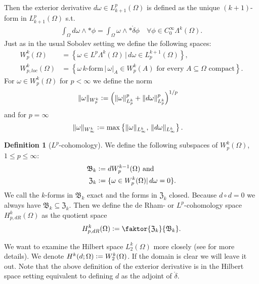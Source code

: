 \documentclass[12pt,a4paper]{article}
\theoremstyle{definition}
\newtheorem{definition}{Definition}
\newcommand{\lpcoho}{H^k_{p,dR}}
\newcommand{\norm}[1]{\lVert #1 \rVert}
\begin{document}
Then the exterior derivative $ d\omega \in L^p_{k+1}(\Omega)$ is defined as
the unique $(k+1)$-form in $L^p_{k+1}(\Omega)$ s.t. 
\begin{align*}
\int_\Omega d\omega \wedge *\phi = \int_\Omega \omega \wedge 
*\mathring{\delta}\phi
\quad \forall \phi \in C_0^\infty \Lambda^{k}(\Omega).
\end{align*}
Just as in the usual Sobolev setting we define the following spaces:
\begin{align*}
W^k_p(\Omega) &= \left\{ \omega \in L^p\Lambda^k(\Omega)\, | 
\, d\omega \in L_p^{k+1}(\Omega) \right\}, \\ %
W^k_{p,loc}(\Omega) &= \left\{ \omega \, k \text{-form} \, | \,
\omega|_A \in W^k_p(A) \text{ for every } A \subseteq \Omega 
\text{ compact} 
\right\}.
\end{align*}
For $\omega \in W^k_p(\Omega)$ for $p<\infty$ we define the norm 
\begin{align*}
\lVert \omega \rVert _{W^k_p} &\vcentcolon= 
\left( \norm{\omega}^p_{L^k_p} + \norm{d\omega}^p_{L^k_p} \right)^{1/p}
\end{align*}
and for $p=\infty$
\begin{align*}
    \lVert \omega \rVert _{W^k_\infty} &\vcentcolon= 
    \max\left\{ \norm{\omega}_{L^k_\infty},\, \norm{d\omega}_{L^k_\infty}
    \right\}.
\end{align*}
    
\begin{definition}[$L^p$-cohomology]
    We define the following subspaces of $W^k_p(\Omega)$, $1\leq p \leq\infty$:
    \begin{align*}
        \mathfrak{B}_k &\vcentcolon= dW^{k-1}_p(\Omega) \text{ and} \\
        \mathfrak{Z}_k &\vcentcolon= \{ \omega \in W^k_p(\Omega)| 
        \, d\omega = 0\}.
    \end{align*}
    We call the $k$-forms in $\mathfrak{B}_k$ exact and the forms in 
    $\mathfrak{Z}_k$ closed. Because $d \circ d=0$ we always have  
    $\mathfrak{B}_k \subseteq \mathfrak{Z}_k$.
    Then we define the de Rham- or $L^p$-cohomology space $\lpcoho(\Omega)$ as 
    the quotient space
    \begin{align*}
        \lpcoho (\Omega) \vcentcolon= \faktor{\mathfrak{Z}_k}{\mathfrak{B}_k}.
    \end{align*}
\end{definition}
\vspace{0.5cm}
We want to examine the Hilbert space $L^k_2(\Omega)$ more closely
(see \cite[Sec. 6.2.6]{arnold} for more details).  
We denote $H^k(d;\Omega) \vcentcolon= W^k_2(\Omega)$. If the domain is clear
we will leave it out. Note that the above definition of the exterior derivative
is in the Hilbert space setting equivalent to defining $d$ as the adjoint
of $\mathring{\delta}$. 
\end{document}
